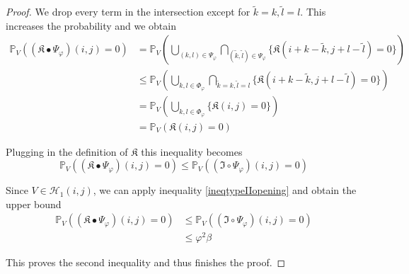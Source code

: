 \documentclass[a4paper,12pt]{article}
\theoremstyle{plain}
\theoremstyle{definition}
\begin{document}
\begin{proof}
	We drop every term in the intersection except for $\tilde{k} = k, \tilde{l} = l$. This increases the probability and we obtain
	\begin{align*}
		\mathbb{P}_V( (\mathfrak{K} \bullet \Psi_\varphi)(i, j) = 0 ) &= \mathbb{P}_V\left( \bigcup_{(k, l) \in \Psi_\varphi} \bigcap_{(\tilde{k}, \tilde{l}) \in \Psi_\varphi} \{ \mathfrak{K}(i + k - \tilde{k}, j + l - \tilde{l}) = 0 \} \right) \\
		&\leq \mathbb{P}_V\left( \bigcup_{k, l \in \Phi_\varphi} \bigcap_{\tilde{k} = k, \tilde{l} = l} \{ \mathfrak{K}(i + k - \tilde{k}, j + l - \tilde{l}) = 0 \} \right) \\
		&= \mathbb{P}_V\left( \bigcup_{k, l \in \Phi_\varphi} \{ \mathfrak{K}(i, j) = 0 \} \right) \\
		&= \mathbb{P}_V\left( \mathfrak{K}(i, j) = 0 \right)
	\end{align*}
	
	Plugging in the definition of $\mathfrak{K}$ this inequality becomes
	\begin{equation*}
		\mathbb{P}_V( (\mathfrak{K} \bullet \Psi_\varphi)(i, j) = 0 ) \leq \mathbb{P}_V( (\mathfrak{I} \circ \Psi_\varphi)(i, j) = 0 )
	\end{equation*}
	
	Since $V \in \mathcal{H}_1(i, j)$, we can apply inequality \eqref{ineqtypeIIopening} and obtain the upper bound
	\begin{align*}
		\mathbb{P}_V( (\mathfrak{K} \bullet \Psi_\varphi)(i, j) = 0 ) &\leq \mathbb{P}_V( (\mathfrak{I} \circ \Psi_\varphi)(i, j) = 0 ) \\
		&\leq \varphi^2 \beta
	\end{align*}
	
	This proves the second inequality and thus finishes the proof.
\end{proof}

\newpage
\end{document}
